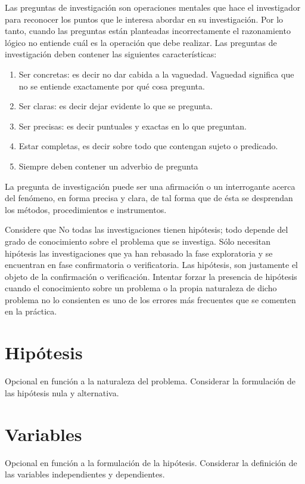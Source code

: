 \documentclass[12]{plan_tesis}
\begin{document}
Las preguntas de investigación son operaciones mentales que hace el investigador para reconocer los puntos que le interesa abordar en su investigación. Por lo tanto, cuando las preguntas están planteadas incorrectamente el razonamiento lógico no entiende cuál es la operación que debe realizar. Las preguntas de investigación deben contener las siguientes características:

\begin{enumerate}
    \item Ser concretas: es decir no dar cabida a la vaguedad. Vaguedad significa que no se entiende exactamente por qué cosa pregunta.
    \item Ser claras: es decir dejar evidente lo que se pregunta.
    \item Ser precisas: es decir puntuales y exactas en lo que preguntan.
    \item Estar completas, es decir sobre todo que contengan sujeto o predicado.
    \item Siempre deben contener un adverbio de pregunta
\end{enumerate}

La pregunta de investigación puede ser una afirmación o un interrogante acerca del fenómeno, en forma precisa y clara, de tal forma que de ésta se desprendan los métodos, procedimientos e instrumentos.\newline

Considere que No todas las investigaciones tienen hipótesis; todo depende del grado de conocimiento sobre el problema que se investiga. Sólo necesitan hipótesis las investigaciones que ya han rebasado la fase exploratoria y se encuentran en fase confirmatoria o verificatoria. Las hipótesis, son justamente el objeto de la confirmación o verificación. Intentar forzar la presencia de hipótesis cuando el conocimiento sobre un problema o la propia naturaleza de dicho problema no lo consienten es uno de los errores más frecuentes que se comenten en la práctica.

\section{Hipótesis}
Opcional en función a la naturaleza del problema. Considerar la formulación de las hipótesis nula y alternativa.

\section{Variables}
Opcional en función a la formulación de la hipótesis. Considerar la definición de las variables independientes y dependientes.
\end{document}
